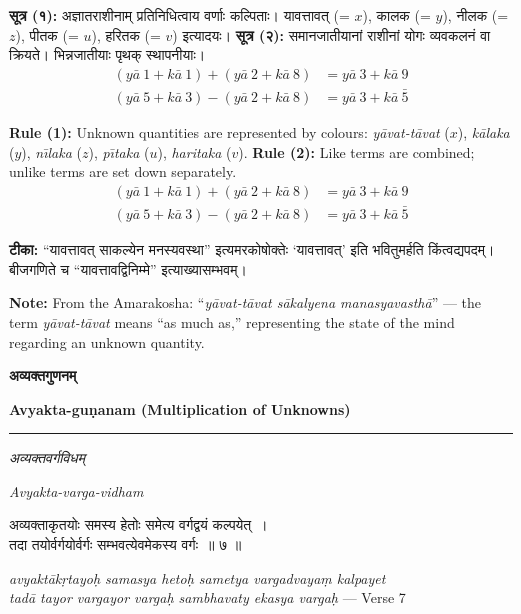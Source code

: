 \documentclass[11pt,a4paper]{article}
\newcommand{\dev}[1]{{\devanagarifont #1}}
\newcommand{\bicol}[2]{%
\noindent%
\begin{minipage}[t]{0.48\textwidth}
\begin{flushleft}
\small
#1
\end{flushleft}
\end{minipage}%
\hfill%
\begin{minipage}[t]{0.48\textwidth}
\begin{flushleft}
\small
#2
\end{flushleft}
\end{minipage}%
\vspace{0.4em}
}
\newcommand{\bicolverse}[2]{%
\par\noindent%
\begin{minipage}[t]{0.48\textwidth}
\centering
\color{versecolor}
\devanagarifont
\small
#1
\end{minipage}%
\hfill%
\begin{minipage}[t]{0.48\textwidth}
\centering
\color{versecolor}
\small
#2
\end{minipage}%
\par\vspace{0.4em}
}
\newcommand{\sectionbicol}[2]{%
\vspace{0.5em}
\noindent%
\begin{minipage}[t]{0.48\textwidth}
\begin{center}
\large\bfseries\color{sectioncolor}
\dev{#1}
\end{center}
\end{minipage}%
\hfill%
\begin{minipage}[t]{0.48\textwidth}
\begin{center}
\large\bfseries\color{sectioncolor}
#2
\end{center}
\end{minipage}%
\vspace{0.3em}
\noindent\rule{\textwidth}{0.4pt}
}
\newcommand{\subsectionbicol}[2]{%
\vspace{0.4em}
\noindent%
\begin{minipage}[t]{0.48\textwidth}
\begin{center}
\normalsize\itshape\color{sectioncolor}
\dev{#1}
\end{center}
\end{minipage}%
\hfill%
\begin{minipage}[t]{0.48\textwidth}
\begin{center}
\normalsize\itshape\color{sectioncolor}
#2
\end{center}
\end{minipage}%
\vspace{0.2em}
}
\begin{document}
\bicol{%
\textbf{सूत्र (१):} अज्ञातराशीनाम् प्रतिनिधित्वाय वर्णाः कल्पिताः। यावत्तावत् (= $x$), कालक (= $y$), नीलक (= $z$), पीतक (= $u$), हरितक (= $v$) इत्यादयः।
\textbf{सूत्र (२):} समानजातीयानां राशीनां योगः व्यवकलनं वा क्रियते। भिन्नजातीयाः पृथक् स्थापनीयाः।
\begin{align*}
(y\bar{a}\ 1 + k\bar{a}\ 1) + (y\bar{a}\ 2 + k\bar{a}\ 8) &= y\bar{a}\ 3 + k\bar{a}\ 9 \\
(y\bar{a}\ 5 + k\bar{a}\ 3) - (y\bar{a}\ 2 + k\bar{a}\ 8) &= y\bar{a}\ 3 + k\bar{a}\ \bar{5}
\end{align*}
}{%
\textbf{Rule (1):} Unknown quantities are represented by colours: \textit{y\={a}vat-t\={a}vat} ($x$), \textit{k\={a}laka} ($y$), \textit{n\={\i}laka} ($z$), \textit{p\={\i}taka} ($u$), \textit{haritaka} ($v$).
\textbf{Rule (2):} Like terms are combined; unlike terms are set down separately.
\begin{align*}
(y\bar{a}\ 1 + k\bar{a}\ 1) + (y\bar{a}\ 2 + k\bar{a}\ 8) &= y\bar{a}\ 3 + k\bar{a}\ 9 \\
(y\bar{a}\ 5 + k\bar{a}\ 3) - (y\bar{a}\ 2 + k\bar{a}\ 8) &= y\bar{a}\ 3 + k\bar{a}\ \bar{5}
\end{align*}
}

\vspace{0.5cm}

\bicol{%
\footnotesize\textbf{टीका:} ``यावत्तावत् साकल्येन मनस्यवस्था'' इत्यमरकोषोक्तेः `यावत्तावत्' इति भवितुमर्हति किंत्वद्यपदम्। बीजगणिते च ``यावत्तावद्विनिम्मे'' इत्याख्यासम्भवम्।
}{%
\footnotesize\textbf{Note:} From the Amarakosha: ``\textit{y\={a}vat-t\={a}vat s\={a}kalyena manasyavasth\={a}}'' --- the term \textit{y\={a}vat-t\={a}vat} means ``as much as,'' representing the state of the mind regarding an unknown quantity.
}

\clearpage

\sectionbicol{अव्यक्तगुणनम्}{Avyakta-gu\d{n}anam (Multiplication of Unknowns)}

\vspace{0.3cm}

\subsectionbicol{अव्यक्तवर्गविधम्}{Avyakta-varga-vidham}

\vspace{0.3cm}

\bicolverse{%
अव्यक्ताकृतयोः समस्य हेतोः समेत्य वर्गद्वयं कल्पयेत्~।\\
तदा तयोर्वर्गयोर्वर्गः सम्भवत्येवमेकस्य वर्गः~॥ ७ ॥
}{%
\textit{avyakt\={a}k\d{r}tayo\d{h} samasya heto\d{h} sametya vargadvaya\d{m} kalpayet}\\
\textit{tad\={a} tayor vargayor varga\d{h} sambhavaty ekasya varga\d{h}} --- Verse 7
}
\end{document}
